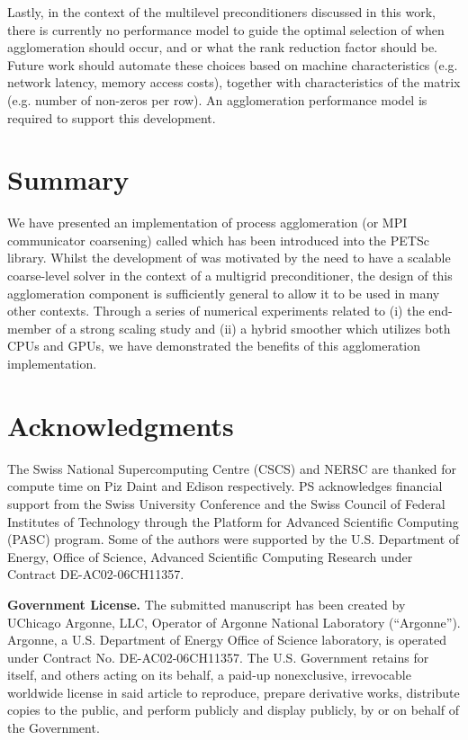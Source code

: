 \documentclass[]{siamart0216}
\begin{document}
Lastly, in the context of the multilevel preconditioners discussed in this work, 
there is currently no performance model to guide the optimal selection of when agglomeration 
should occur, and or what the rank reduction factor should be. 
Future work should automate these choices based on machine characteristics (e.g. network latency, memory access costs), together 
with characteristics of the matrix (e.g. number of non-zeros per row). An agglomeration performance model is required to support this development.


\section{Summary}
We have presented an implementation of process agglomeration (or MPI communicator coarsening) 
called  which has been introduced into the PETSc library. Whilst the development of  was 
motivated by the need to have a scalable coarse-level solver in the context of a multigrid preconditioner, the design of 
this agglomeration component is sufficiently general to allow it to be used in many other contexts.  
Through a series of numerical experiments related to (i) the end-member of a strong scaling study and (ii) a hybrid 
smoother which utilizes both CPUs and GPUs, we have demonstrated the benefits of this agglomeration 
implementation. 

\section{Acknowledgments}
The Swiss National Supercomputing Centre (CSCS) and NERSC are thanked for compute time on Piz Daint and Edison respectively.
PS acknowledges financial support from the Swiss University Conference and the Swiss Council of Federal
Institutes of Technology through the Platform for Advanced Scientific Computing (PASC) program.
Some of the authors were supported by the U.S. Department of Energy, Office of Science, Advanced Scientific Computing Research under Contract DE-AC02-06CH11357.

{\bf Government License.} The submitted manuscript has been created by UChicago 
Argonne, LLC,
Operator of Argonne National Laboratory (``Argonne'').
Argonne, a U.S. Department of Energy Office of Science laboratory, is
operated under Contract No. DE-AC02-06CH11357. The U.S. Government
retains for itself, and others acting on its behalf, a paid-up
nonexclusive, irrevocable worldwide license in said article to reproduce,
prepare derivative works, distribute copies to the public, and perform
publicly and display publicly, by or on behalf of the Government.
\end{document}
